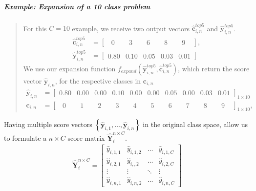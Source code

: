 \subparagraph{Example: Expansion of a 10 class problem} 
\blockquote[]{	 	
	For this $C=10$ example, we receive two output vectors $\bm{\hat{c}}_{i,n}^{top5}$ and $ \bm{\hat{y}}_{i,n}^{top5}$.
	\begin{align*}
	\bm{\hat{c}}_{i,n}^{top5} &= \begin{bmatrix}
	\phantom{0}0\phantom{.0} & \phantom{0}3\phantom{.0} & \phantom{0}6\phantom{.0} & \phantom{0}8\phantom{.0} & \phantom{0}9\phantom{.0}
	\end{bmatrix},\\
	\bm{\hat{y}}_{i,n}^{top5} &= \begin{bmatrix}
	0.80 & 0.10 & 0.05 & 0.03 & 0.01
	\end{bmatrix}
	\end{align*}
	We use our expansion function $ f_{expand}\left(\bm{\hat{y}}_{i,n}^{top5},\bm{\hat{c}}_{i,n}^{top5}\right) $, which return the score vector $ \mathbf{\hat{y}}_{i,n}$, for the respective classes in $ \bm{c}_{i,n} $
	\begin{align*}
	\mathbf{\hat{y}}_{i,n}  &= \begin{bmatrix}
	0.80 & 0.00 & 0.00 & 0.10 & 0.00 & 0.00 & 0.05 & 0.00 & 0.03 & 0.01
	\end{bmatrix}_{1 \times 10} \\
	\bm{c}_{i,n} &= \begin{bmatrix}
	\phantom{0}0\phantom{.0} & \phantom{0}1\phantom{.0} & \phantom{0}2\phantom{.0} & \phantom{0}3\phantom{.0} & \phantom{0}4\phantom{.0} & \phantom{0}5\phantom{.0} & \phantom{0}6\phantom{.0} & \phantom{0}7\phantom{.0} & \phantom{0}8\phantom{.0} & \phantom{0}9\phantom{.0}
	\end{bmatrix}_{1 \times 10},
	\end{align*}
}      

Having multiple score vectors $ \left\{\bm{\hat{y}}_{i,1}, \dots, \bm{\hat{y}}_{i,n}\right\}  $ in the original class space, allow us to formulate a $ n \times C $ score matrix $ \bm{\hat{Y}}_{i}^{n \times C} $.
\begin{align}
\bm{\hat{Y}}_{i}^{n \times C} =
\begin{bmatrix}
\hat{y}_{i,1,1} & \hat{y}_{i,1,2} & \dots & \hat{y}_{i,1,C} \\
\hat{y}_{i,2,1} & \hat{y}_{i,,2} & \dots & \hat{y}_{i,2,C} \\
\vdots & \vdots & \ddots & \vdots \\
\hat{y}_{i,n,1} & \hat{y}_{i,n,2} & \dots & \hat{y}_{i,n,C}
\end{bmatrix}
\end{align}

